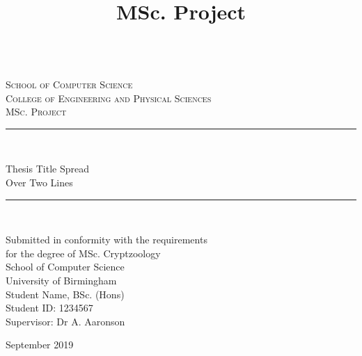 \documentclass[twoside,11pt,a4paper]{article}
\title{MSc. Project\\\bhamthesistitle}
\author{\textsf{\bhamstudentname {\textsf{Degree Postnomials}}}}
\date{}
\newcommand{\bhamstudentname}{Student Name}
\newcommand{\bhamfronttitle}{Thesis Title Spread\\Over Two Lines}
\newcommand{\bhamschool}{School of Computer Science}
\newcommand{\bhamcollege}{Engineering and Physical Sciences}
\newcommand{\bhamdegree}{MSc. Cryptzoology}
\newcommand{\bhamid}{1234567}
\newcommand{\bhamsupervisor}{Dr A. Aaronson}
\newcommand{\bhamyear}{2019}
\newcommand{\HRule}{\rule{\linewidth}{0.5mm}}
\begin{document}
\begin{titlepage}
\begin{center}
\begin{minipage}{6in}
  \centering
  \hspace*{.2in}
  \end{minipage}
  \\ [1.0cm]
\textsc{{\LARGE \bhamschool\\}College of \bhamcollege}\\[3.5cm]

\textsc{\Large MSc. Project}\\[0.5cm]

\HRule \\[0.4cm]
\begin{center}\Huge
\bhamfronttitle
\end{center}
\HRule \\[1.5cm]

\begin{center}
Submitted in conformity with the requirements\\ for the degree of \bhamdegree\\
\bhamschool\\ University of Birmingham\\
\vspace{2cm}
\bhamstudentname, BSc. (Hons)\\
Student ID: \bhamid\\
Supervisor: \bhamsupervisor      
\end{center}
\vfill

{\large September \bhamyear}

\end{center}
\end{titlepage}
\cleardoublepage
\end{document}
